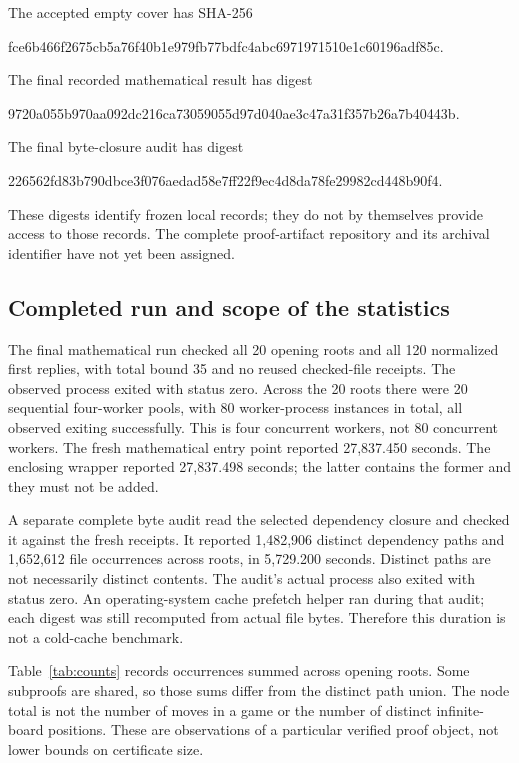 \documentclass[11pt]{article}
\theoremstyle{definition}
\theoremstyle{remark}
\begin{document}
The accepted empty cover has SHA-256
\begin{center}\small\ttfamily
fce6b466f2675cb5a76f40b1e979fb77bdfc4abc6971971510e1c60196adf85c.
\end{center}
The final recorded mathematical result has digest
\begin{center}\small\ttfamily
9720a055b970aa092dc216ca73059055d97d040ae3c47a31f357b26a7b40443b.
\end{center}
The final byte-closure audit has digest
\begin{center}\small\ttfamily
226562fd83b790dbce3f076aedad58e7ff22f9ec4d8da78fe29982cd448b90f4.
\end{center}
These digests identify frozen local records; they do not by themselves
provide access to those records. The complete proof-artifact repository
and its archival identifier have not yet been assigned.

\subsection{Completed run and scope of the statistics}
The final mathematical run checked all 20 opening roots and all 120
normalized first replies, with total bound 35 and no reused checked-file
receipts. The observed process exited with status zero. Across the 20 roots
there were 20 sequential four-worker pools, with 80 worker-process instances
in total, all observed exiting successfully. This is four concurrent
workers, not 80 concurrent workers. The fresh mathematical entry point
reported 27,837.450 seconds. The enclosing wrapper reported 27,837.498
seconds; the latter contains the former and they must not be added.

A separate complete byte audit read the selected dependency closure and
checked it against the fresh receipts. It reported 1,482,906 distinct
dependency paths and 1,652,612 file occurrences across roots, in
5,729.200 seconds. Distinct paths are not necessarily distinct contents.
The audit's actual process also exited with status zero. An operating-system
cache prefetch helper ran during that audit; each digest was still recomputed
from actual file bytes. Therefore this duration is not a cold-cache benchmark.

Table~\ref{tab:counts} records occurrences summed across opening roots.
Some subproofs are shared, so those sums differ from the distinct path union.
The node total is not the number of moves in a game or the number of
distinct infinite-board positions. These are observations of a particular
verified proof object, not lower bounds on certificate size.
\end{document}

